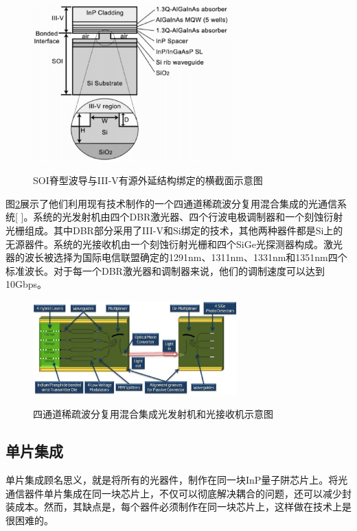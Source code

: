 \documentclass{ZJUthesis}
\begin{document}
\begin{figure}[!ht]
  \centering
  \includegraphics[width=0.7\textwidth]{./Pictures/hybrid.eps}\\
  \caption{SOI脊型波导与III-V有源外延结构绑定的横截面示意图}
  \label{fig_hybrid}
\end{figure}

图\ref{fig_hybrid2}展示了他们利用现有技术制作的一个四通道稀疏波分复用混合集成的光通信系统[ ]。系统的光发射机由四个DBR激光器、四个行波电极调制器和一个刻蚀衍射光栅组成。其中DBR部分采用了III-V和Si绑定的技术，其他两种器件都是Si上的无源器件。系统的光接收机由一个刻蚀衍射光栅和四个SiGe光探测器构成。激光器的波长被选择为国际电信联盟确定的1291nm、1311nm、1331nm和1351nm四个标准波长。对于每一个DBR激光器和调制器来说，他们的调制速度可以达到10Gbps。

\begin{figure}[!ht]
  \centering
  \includegraphics[width=0.7\textwidth]{./Pictures/hybrid2.eps}\\
  \caption{四通道稀疏波分复用混合集成光发射机和光接收机示意图}
  \label{fig_hybrid2}
\end{figure}

\subsection{单片集成}

单片集成顾名思义，就是将所有的光器件，制作在同一块InP量子阱芯片上。将光通信器件单片集成在同一块芯片上，不仅可以彻底解决耦合的问题，还可以减少封装成本。然而，其缺点是，每个器件必须制作在同一块芯片上，这样做在技术上是很困难的。
\end{document}
